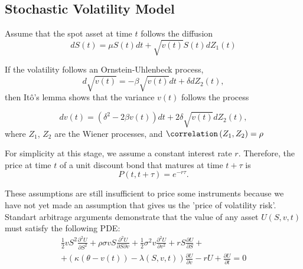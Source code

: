 \subsection{Stochastic Volatility Model}

    \begin{frame}
            Assume that the spot asset at time $t$ follows the diffusion
            \begin{equation}\label{Heston93:eq0}
                dS(t) = \mu S(t)dt + \sqrt{v(t)} S(t) dZ_1(t)
            \end{equation}
        
            If the volatility follows an Ornstein-Uhlenbeck process, 
            \begin{equation}
                d\sqrt{v(t)} = -\beta \sqrt{v(t)}dt +\delta dZ_2(t),
            \end{equation}
            then It\^{o}'s lemma shows that the variance $v(t)$ follows the process
        
            \begin{equation}
                dv(t) = \left(\delta^2 - 2\beta v(t)\right) dt + 2\delta \sqrt{v(t)} dZ_2(t),
            \end{equation}
            where $Z_1$, $Z_2$ are the Wiener processes, and $\correlation\left(Z_1, Z_2\right) = \rho$
    \end{frame}

    \begin{frame}
            For  simplicity  at  this  stage, we  assume  a  constant  interest  rate  $r$.  
            Therefore,  the  price  at  time  $t$  of a  unit  discount  bond  that  matures  at  time $t+\tau$ is
            \begin{equation}
                P(t, t + \tau) = e^{-r\tau}.
            \end{equation}
            
            These assumptions are still insufficient to price some instruments because we have not yet made an 
            assumption that gives us the 'price of volatility risk'. Standart arbitrage arguments demonstrate that the value
            of any asset $U(S, v ,t)$ must satisfy the following PDE:
            \begin{multline}\label{Heston93:assetpde}
                \frac{1}{2}vS^2\frac{\partial^2 U}{\partial S^2} + \rho\sigma v S \frac{\partial^2 U}{\partial S \partial v} + \frac{1}{2}\sigma^2 v \frac{\partial^2 U}{\partial v^2} + 
                rS\frac{\partial U}{\partial S} +\\+ \left(\kappa(\theta - v(t)) - \lambda(S, v, t)\right)\frac{\partial U}{\partial v}
                - rU + \frac{\partial U}{\partial t} = 0
            \end{multline}
    \end{frame}

